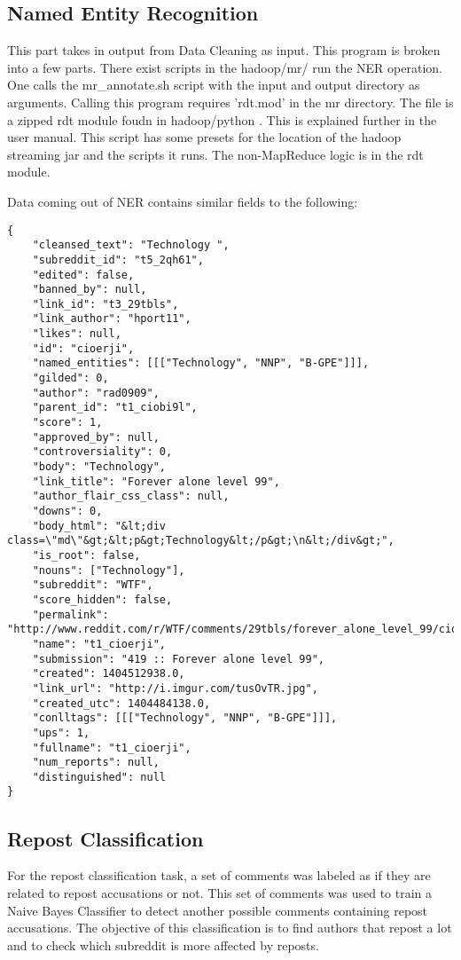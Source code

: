 \documentclass[12pt,a4paper]{article}
\begin{document}
\subsection{Named Entity Recognition}

This part takes in output from Data Cleaning as input.
This program is broken into a few parts. There exist scripts
in the hadoop/mr/ run the NER operation. One calls
the mr\_annotate.sh script with the input and output directory
as arguments. Calling this program requires 'rdt.mod' in the mr directory.
The file is a zipped rdt module foudn in hadoop/python . This
is explained further in the user manual. This script
has some presets for the location of the hadoop streaming
jar and the scripts it runs.
The non-MapReduce logic is in the rdt module.

Data coming out of NER contains similar fields to the following:

\begin{lstlisting}
{
	"cleansed_text": "Technology ", 
	"subreddit_id": "t5_2qh61", 
	"edited": false, 
	"banned_by": null, 
	"link_id": "t3_29tbls", 
	"link_author": "hport11", 
	"likes": null, 
	"id": "cioerji", 
	"named_entities": [[["Technology", "NNP", "B-GPE"]]], 
	"gilded": 0, 
	"author": "rad0909", 
	"parent_id": "t1_ciobi9l",
	"score": 1, 
	"approved_by": null, 
	"controversiality": 0, 
	"body": "Technology", 
	"link_title": "Forever alone level 99", 
	"author_flair_css_class": null, 
	"downs": 0, 
	"body_html": "&lt;div class=\"md\"&gt;&lt;p&gt;Technology&lt;/p&gt;\n&lt;/div&gt;", 
	"is_root": false, 
	"nouns": ["Technology"], 
	"subreddit": "WTF", 
	"score_hidden": false, 
	"permalink": "http://www.reddit.com/r/WTF/comments/29tbls/forever_alone_level_99/cioerji", 
	"name": "t1_cioerji", 
	"submission": "419 :: Forever alone level 99", 
	"created": 1404512938.0, 
	"link_url": "http://i.imgur.com/tusOvTR.jpg", 
	"created_utc": 1404484138.0, 
	"conlltags": [[["Technology", "NNP", "B-GPE"]]], 
	"ups": 1, 
	"fullname": "t1_cioerji", 
	"num_reports": null, 
	"distinguished": null
}

\end{lstlisting}


\subsection{Repost Classification}

For the repost classification task, a set of comments was labeled as if 
they are related to repost accusations or not. This set of comments was used
to train a Naive Bayes Classifier to detect another possible comments
containing repost accusations.
The objective of this classification is to find authors that repost a lot and
to check which subreddit is more affected by reposts.
\end{document}
